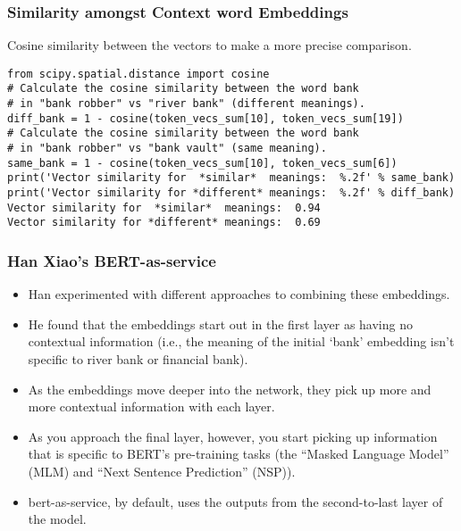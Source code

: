 \begin{frame}[fragile]\frametitle{Similarity amongst Context word Embeddings}

Cosine similarity between the vectors to make a more precise comparison.

\begin{lstlisting}
from scipy.spatial.distance import cosine
# Calculate the cosine similarity between the word bank 
# in "bank robber" vs "river bank" (different meanings).
diff_bank = 1 - cosine(token_vecs_sum[10], token_vecs_sum[19])
# Calculate the cosine similarity between the word bank
# in "bank robber" vs "bank vault" (same meaning).
same_bank = 1 - cosine(token_vecs_sum[10], token_vecs_sum[6])
print('Vector similarity for  *similar*  meanings:  %.2f' % same_bank)
print('Vector similarity for *different* meanings:  %.2f' % diff_bank)
Vector similarity for  *similar*  meanings:  0.94
Vector similarity for *different* meanings:  0.69
\end{lstlisting}
\end{frame}

\begin{frame}[fragile]\frametitle{Han Xiao's BERT-as-service}

\begin{itemize}
\item Han experimented with different approaches to combining these embeddings.
\item He found that the embeddings start out in the first layer as having no contextual information (i.e., the meaning of the initial `bank' embedding isn't specific to river bank or financial bank).
\item As the embeddings move deeper into the network, they pick up more and more contextual information with each layer.
\item As you approach the final layer, however, you start picking up information that is specific to BERT's pre-training tasks (the ``Masked Language Model'' (MLM) and ``Next Sentence Prediction'' (NSP)).
\item bert-as-service, by default, uses the outputs from the second-to-last layer of the model.
\end{itemize}

\end{frame}
